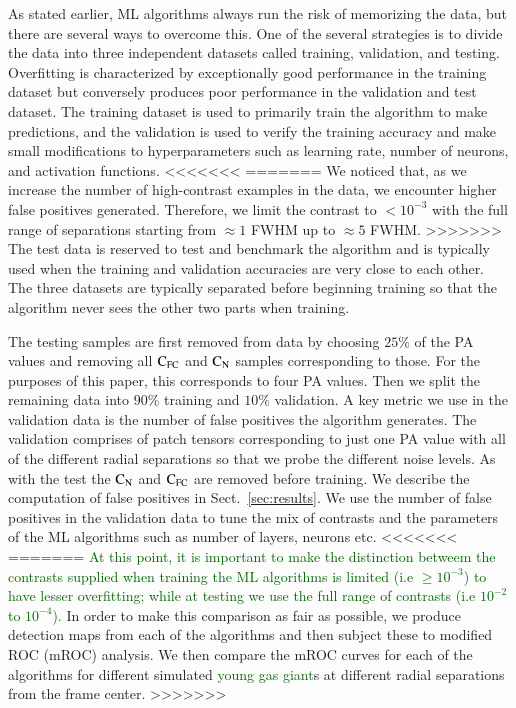 \documentclass{aa}
\newcommand{\newchange}[1]{\textcolor{darkgreen}{#1}}
\begin{document}
{{{As stated earlier, ML algorithms always run the risk of memorizing the data, but there are several ways to overcome this.
One of the several strategies is to divide the data into three independent datasets called training, validation, and testing.
Overfitting is characterized by exceptionally good performance in the training dataset but conversely produces poor performance in the validation and test dataset.
The training dataset is used to primarily train the algorithm to make predictions, and the validation is used to verify the training accuracy and make small modifications to hyperparameters such as learning rate, number of neurons, and activation functions. %
<<<<<<<
=======
We noticed that, as we increase the number of high-contrast examples in the data, we encounter higher false positives generated. Therefore, we limit the contrast to $<10^{-3}$ with the full range of separations starting from $\approx 1$ FWHM up to $\approx 5$ FWHM.
>>>>>>>
The test data is reserved to test and benchmark the algorithm and is typically used when the training and validation accuracies are very close to each other.
The three datasets are typically separated before beginning training so that the algorithm never sees the other two parts when training.

The testing samples are first removed from data by choosing $25\%$ of the PA values and removing all $\rm{C_{FC}}$ and $\rm{C_N}$ samples corresponding to those. 
For the purposes of this paper, this corresponds to four PA values.
Then we split the remaining data into $90\%$ training and $10\%$ validation.
A key metric we use in the validation data is the number of false positives the algorithm generates. 
The validation comprises of patch tensors corresponding to just one PA value with all of the different radial separations so that we probe the different noise levels.
As with the test the $\rm{C_N}$ and $\rm{C_{FC}}$ are removed before training.
We describe the computation of false positives in Sect.~\ref{sec:results}.
We use the number of false positives in the validation data to tune the mix of contrasts and the parameters of the ML algorithms such as number of layers, neurons etc.
<<<<<<<
=======
\newchange{At this point, it is important to make the distinction betweem the contrasts supplied when training the ML algorithms is limited (i.e $\ge 10^{-3}$) to have lesser overfitting; while at testing we use the full range of contrasts (i.e $10^{-2}$ to $10^{-4}$).}
In order to make this comparison as fair as possible, we produce detection maps from each of the algorithms and then subject these to modified ROC (mROC) analysis.
We then compare the mROC curves for each of the algorithms for different simulated \newchange{young gas giant}s at different radial separations from the frame center.
>>>>>>>

}}}
\end{document}

